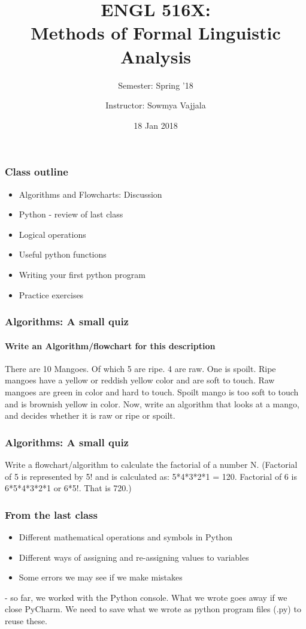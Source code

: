\documentclass{beamer}
\author[Sowmya Vajjala]{Instructor: Sowmya Vajjala}
\title[ENGL 516X]{ENGL 516X: \\ Methods of Formal Linguistic Analysis}
\subtitle{Semester: Spring '18}
\date{18 Jan 2018}
\institute{Iowa State University, USA}
\begin{document}
\begin{frame}\titlepage
\end{frame}


\begin{frame}
\frametitle{Class outline}
\begin{itemize}
\item Algorithms and Flowcharts: Discussion %
\item Python - review of last class
\item Logical operations 
\item Useful python functions %
\item Writing your first python program %
\item Practice exercises%
\end{itemize}
\end{frame}

\begin{frame}
\frametitle{Algorithms: A small quiz} %
\framesubtitle{Write an Algorithm/flowchart for this description}
There are 10 Mangoes. Of which 5 are ripe. 4 are raw. One is spoilt. Ripe mangoes have a yellow or reddish yellow color and are soft to touch. Raw mangoes are green in color and hard to touch. Spoilt mango is too soft to touch and is brownish yellow in color. Now, write an algorithm that looks at a mango, and decides whether it is raw or ripe or spoilt. 
\end{frame}

\begin{frame}
\frametitle{Algorithms: A small quiz} %
Write a flowchart/algorithm to calculate the factorial of a number N. (Factorial of 5 is represented by 5! and is calculated as: 5*4*3*2*1 = 120. Factorial of 6 is 6*5*4*3*2*1 or 6*5!. That is 720.)
\end{frame}

\begin{frame}
\frametitle{From the last class}
\begin{itemize}
\item Different mathematical operations and symbols in Python
\item Different ways of assigning and re-assigning values to variables
\item Some errors we may see if we make mistakes
\end{itemize}
- so far, we worked with the Python console. What we wrote goes away if we close PyCharm. We need to save what we wrote as python program files (.py) to reuse these.
\end{frame}
\end{document}
